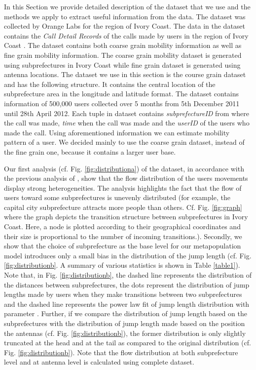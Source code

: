\documentclass[review]{elsarticle}
\begin{document}
In this Section we provide detailed description of the  dataset that we use and the methods we apply to extract useful information from the data. The dataset was collected by Orange Labs for the region of Ivory Coast. The data in the dataset contains the \emph{Call Detail Records} of the calls made by users in the region of Ivory Coast \cite{Blondel2012}. The dataset contains both coarse grain mobility information as well as fine grain mobility information. The coarse grain mobility dataset is generated using subprefectures in Ivory Coast while fine grain dataset is generated using antenna locations. The dataset we use in this section is the course grain dataset and has the following structure. It contains the central location of the subprefecture area in the longitude and latitude format. The dataset contains information of 500,000 users collected over 5 months from 5th December 2011 until 28th April 2012. Each tuple in dataset contains \emph{subprefectureID} from where the call was made, \emph{time} when the call was made and the \emph{userID} of the users who made the call. Using aforementioned information we can estimate mobility pattern of a user. We decided mainly to use the coarse grain dataset, instead of the fine grain one, because it contains a larger user base.

Our first analysis (cf. Fig. \ref{fig:distributiona}) of the dataset, in accordance with the previous analysis of \cite{gonzálezunderstanding2008, brockmannthe2006, colizzaepidemic2008}, show that the flow distribution of the users movements display strong heterogeneities. The analysis highlights the fact that the flow of users toward some subprefectures is unevenly distributed (for example, the capital city subprefecture attracts more people than others. Cf. Fig. \ref{fig:graph} where the graph depicts the transition structure between subprefectures in Ivory Coast. Here, a node is plotted according to their geographical coordinates and their size is proportional to the number of incoming transitions.). Secondly, we show that the choice of subprefecture as the base level for our metapopulation model introduces only a small bias in the distribution of the jump length (cf. Fig. \ref{fig:distributionb}. A summary of various statistics is shown in Table \ref{table1}). Note that, in Fig. \ref{fig:distributionb}, the dashed line represents the distribution of the distances between subprefectures, the dots represent the distribution of jump lengths made by users when they make transitions between two subprefectures and the dashed line represents the power law fit of jump length distribution with parameter . Further, if we compare the distribution of jump length based on the subprefectures with the distribution of jump length made based on the position the antennas (cf. Fig. \ref{fig:distributionb}), the former distribution is only slightly truncated at the head and at the tail as compared to the original distribution (cf. Fig. \ref{fig:distributionb}). Note that the flow distribution at both subprefecture level and at antenna level is calculated using complete dataset. 
\end{document}
